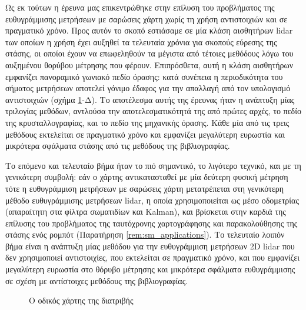Ως εκ τούτων η έρευνα μας επικεντρώθηκε στην επίλυση του προβλήματος της
ευθυγράμμισης μετρήσεων με σαρώσεις χάρτη χωρίς τη χρήση αντιστοιχιών και σε
πραγματικό χρόνο. Προς αυτόν το σκοπό εστιάσαμε σε μία κλάση αισθητήρων lidar
των οποίων η χρήση έχει αυξηθεί τα τελευταία χρόνια για σκοπούς εύρεσης της
στάσης, οι οποίοι έχουν να επωφεληθούν τα μέγιστα από τέτοιες μεθόδους λόγω
του αυξημένου θορύβου μέτρησης που φέρουν. Επιπρόσθετα, αυτή η κλάση αισθητήρων
εμφανίζει πανοραμικό γωνιακό πεδίο όρασης: κατά συνέπεια η περιοδικότητα του
σήματος μετρήσεων αποτελεί γόνιμο έδαφος για την απαλλαγή από τον υπολογισμό
αντιστοιχιών (σχήμα \ref{fig:roadmap}-Δ). Το αποτέλεσμα αυτής της έρευνας ήταν
η ανάπτυξη μίας τριλογίας μεθόδων, αντλούσα την αποτελεσματικότητά της από
πρώτες αρχές, το πεδίο της κρυσταλλογραφίας, και το πεδίο της μηχανικής όρασης.
Κάθε μία από τις τρεις μεθόδους εκτελείται σε πραγματικό χρόνο και εμφανίζει
μεγαλύτερη ευρωστία και μικρότερα σφάλματα στάσης από τις μεθόδους της
βιβλιογραφίας.

Το επόμενο και τελευταίο βήμα ήταν το πιό σημαντικό, το λιγότερο τεχνικό, και
με τη γενικότερη συμβολή: εάν ο χάρτης αντικατασταθεί με μία δεύτερη φυσική
μέτρηση τότε η ευθυγράμμιση μετρήσεων με σαρώσεις χάρτη μετατρέπεται στη
γενικότερη μέθοδο ευθυγράμμισης μετρήσεων lidar, η οποία χρησιμοποιείται
ως μέσο οδομετρίας (απαραίτητη στα φίλτρα σωματιδίων και Kalman), και βρίσκεται
στην καρδιά της επίλυσης του προβλήματος της ταυτόχρονης χαρτογράφησης και
παρακολούθησης της στάσης ενός ρομπότ (Παρατήρηση \ref{rem:sm_applications}).
Το τελευταίο λοιπόν βήμα είναι η ανάπτυξη μίας μεθόδου για την ευθυγράμμιση
μετρήσεων 2D lidar που δεν χρησιμοποιεί αντιστοιχίες, που εκτελείται σε
πραγματικό χρόνο, και που εμφανίζει μεγαλύτερη ευρωστία στο θόρυβο μέτρησης
και μικρότερα σφάλματα ευθυγράμμισης σε σχέση με αντίστοιχες μεθόδους της
βιβλιογραφίας.

\begin{figure}\hspace{-2cm}
  
  \caption{\small Ο οδικός χάρτης της διατριβής}
  \label{fig:roadmap}
\end{figure}
